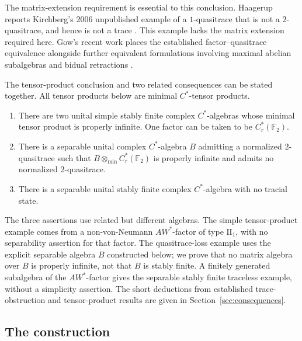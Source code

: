The matrix-extension requirement is essential to this conclusion.
Haagerup reports Kirchberg's 2006 unpublished example of a
\(1\)-quasitrace that is not a \(2\)-quasitrace, and hence is not a trace
\cite[Introduction]{Haagerup}. This example lacks the matrix extension
required here.
Gow's recent work places the established factor--quasitrace equivalence
alongside further equivalent formulations involving maximal abelian
subalgebras and bidual retractions \cite[Theorem~4.11]{Gow}.

The tensor-product conclusion and two related consequences can be stated
together. All tensor products below are minimal \(C^*\)-tensor products.

\begin{corollary}
\label{cor:stable-finiteness}
\leavevmode
\begin{enumerate}[label=\textup{(\roman*)}]
\item There are two unital simple stably finite complex \(C^*\)-algebras
whose minimal tensor product is properly infinite. One factor can be
taken to be \(C_r^*(\mathbb F_2)\).
\item There is a separable unital complex \(C^*\)-algebra \(B\) admitting
a normalized \(2\)-quasitrace such that
\(B\otimes_{\min}C_r^*(\mathbb F_2)\) is properly infinite and admits no
normalized \(2\)-quasitrace.
\item There is a separable unital stably finite complex \(C^*\)-algebra
with no tracial state.
\end{enumerate}
\end{corollary}

The three assertions use related but different algebras. The simple
tensor-product example comes from a non-von-Neumann \(AW^*\)-factor of
type \(\mathrm{II}_1\), with no separability assertion for that factor.
The quasitrace-loss example uses the explicit separable algebra \(B\)
constructed below; we prove that no matrix algebra over \(B\) is properly
infinite, not that \(B\) is stably finite. A finitely generated subalgebra
of the \(AW^*\)-factor gives the separable stably finite traceless example,
without a simplicity assertion. The short deductions from established
trace-obstruction and tensor-product results are given in
Section~\ref{sec:consequences}.

\subsection*{The construction}

